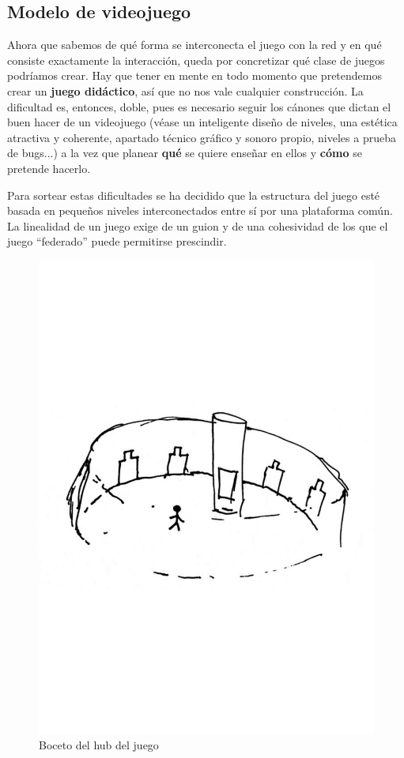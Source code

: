 \subsection{Modelo de videojuego}\label{subsec:modelojuego}
Ahora que sabemos de qué forma se interconecta el juego con la red y en qué consiste exactamente la interacción, queda por concretizar qué clase de juegos podríamos crear. Hay que tener en mente en todo momento que pretendemos crear un \textbf{juego didáctico}, así que no nos vale cualquier construcción. La dificultad es, entonces, doble, pues es necesario seguir los cánones que dictan el buen hacer de un videojuego (véase un inteligente diseño de niveles, una estética atractiva y coherente, apartado técnico gráfico y sonoro propio, niveles a prueba de bugs...) a la vez que planear \textbf{qué} se quiere enseñar en ellos y \textbf{cómo} se pretende hacerlo.

Para sortear estas dificultades se ha decidido que la estructura del juego esté basada en pequeños niveles interconectados entre sí por una plataforma común. La linealidad de un juego exige de un guion y de una cohesividad de los que el juego ``federado'' puede permitirse  prescindir.

\begin{figure}[H]
  \centering
  \includegraphics[scale=0.35, trim={0 9cm 0 9cm}]{imagenes/hall_juego}
  \caption{Boceto del hub del juego}
  \label{fig:hall}
\end{figure}

